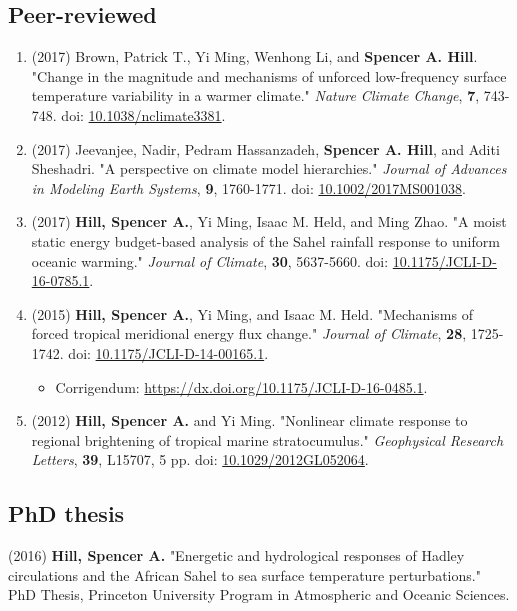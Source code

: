 \documentclass[12pt,letterpaper]{shillcv}
\begin{document}
\subsection*{Peer-reviewed}
\label{sec:org62c298e}
\begin{enumerate}
\item (2017) Brown, Patrick T., Yi Ming, Wenhong Li, and \textbf{Spencer A. Hill}.  "Change
in the magnitude and mechanisms of unforced low-frequency surface temperature
variability in a warmer climate."  \emph{Nature Climate Change}, \textbf{7}, 743-748.
doi: \href{https://doi.org/10.1038/nclimate3381}{10.1038/nclimate3381}.
\item (2017) Jeevanjee, Nadir, Pedram Hassanzadeh, \textbf{Spencer A. Hill}, and Aditi
Sheshadri.  "A perspective on climate model hierarchies."  \emph{Journal
of Advances in Modeling Earth Systems}, \textbf{9}, 1760-1771.  doi: \href{https://doi.org/10.1002/2017MS001038}{10.1002/2017MS001038}.
\item (2017) \textbf{Hill, Spencer A.}, Yi Ming, Isaac M. Held, and Ming Zhao.  "A moist
static energy budget-based analysis of the Sahel rainfall response to uniform
oceanic warming."  \emph{Journal of Climate}, \textbf{30}, 5637-5660.  doi:
\href{https://doi.org/10.1175/JCLI-D-16-0785.1}{10.1175/JCLI-D-16-0785.1}.
\item (2015) \textbf{Hill, Spencer A.}, Yi Ming, and Isaac M. Held.  "Mechanisms of forced
tropical meridional energy flux change."  \emph{Journal of Climate}, \textbf{28}, 1725-1742.
doi: \href{http://dx.doi.org/10.1175/JCLI-D-14-00165.1}{10.1175/JCLI-D-14-00165.1}.
\begin{itemize}
\item Corrigendum: \url{https://dx.doi.org/10.1175/JCLI-D-16-0485.1}.
\end{itemize}
\item (2012) \textbf{Hill, Spencer A.} and Yi Ming.  "Nonlinear climate response to regional
brightening of tropical marine stratocumulus."  \emph{Geophysical Research Letters},
\textbf{39}, L15707, 5 pp. doi:
\href{http://dx.doi.org/10.1029/2012GL052064}{10.1029/2012GL052064}.
\end{enumerate}
\subsection*{PhD thesis}
\label{sec:orgd58475e}
(2016) \textbf{Hill, Spencer A.} "Energetic and hydrological responses of Hadley
circulations and the African Sahel to sea surface temperature perturbations."
PhD Thesis, Princeton University Program in Atmospheric and Oceanic Sciences.
\end{document}
